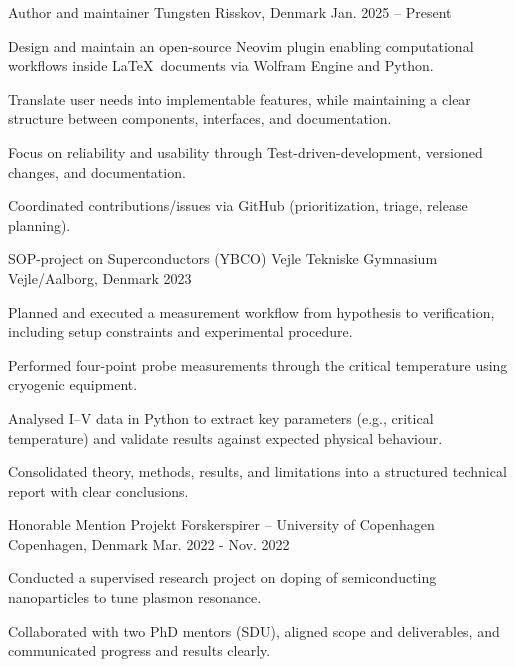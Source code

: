 
\begin{cventries}
  \cventry
    {Author and maintainer} %
    {Tungsten} %
    {Risskov, Denmark} %
    {Jan. 2025 -- Present} %
    {
      \begin{cvitems} %
      \item Design and maintain an open-source Neovim plugin enabling computational workflows inside \LaTeX\ documents via Wolfram Engine and Python.
      \item Translate user needs into implementable features, while maintaining a clear structure between components, interfaces, and documentation.
      \item Focus on reliability and usability through Test-driven-development, versioned changes, and documentation.
      \item Coordinated contributions/issues via GitHub (prioritization, triage, release planning).
      \end{cvitems}
    }

  \cventry
    {SOP-project on Superconductors (YBCO)} %
    {Vejle Tekniske Gymnasium} %
    {Vejle/Aalborg, Denmark} %
    {2023} %
    {
      \begin{cvitems} %
      \item Planned and executed a measurement workflow from hypothesis to verification, including setup constraints and experimental procedure.
      \item Performed four-point probe measurements through the critical temperature using cryogenic equipment.
      \item Analysed I--V data in Python to extract key parameters (e.g., critical temperature) and validate results against expected physical behaviour.
      \item Consolidated theory, methods, results, and limitations into a structured technical report with clear conclusions.
      \end{cvitems}
    }

  \cventry
    {Honorable Mention} %
    {Projekt Forskerspirer -- University of Copenhagen} %
    {Copenhagen, Denmark} %
    {Mar. 2022 - Nov. 2022} %
    {
      \begin{cvitems} %
      \item Conducted a supervised research project on doping of semiconducting nanoparticles to tune plasmon resonance.
      \item Collaborated with two PhD mentors (SDU), aligned scope and deliverables, and communicated progress and results clearly.
      \end{cvitems}
    }


\end{cventries}
